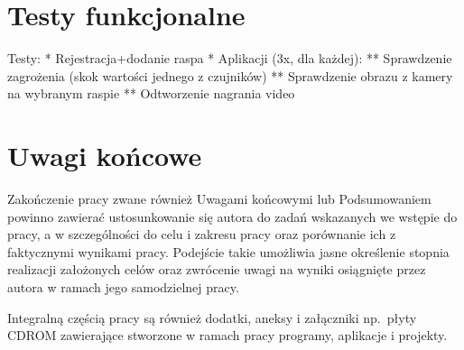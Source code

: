 \chapter{Testy funkcjonalne}

Testy:
 * Rejestracja+dodanie raspa
 * Aplikacji (3x, dla każdej):
 ** Sprawdzenie zagrożenia (skok wartości jednego z czujników)
 ** Sprawdzenie obrazu z kamery na wybranym raspie
 ** Odtworzenie nagrania video

\chapter{Uwagi końcowe}

Zakończenie pracy zwane również Uwagami końcowymi lub Podsumowaniem powinno zawierać ustosunkowanie
się autora do zadań wskazanych we wstępie do pracy, a w szczególności do celu i zakresu pracy oraz
porównanie ich z faktycznymi wynikami pracy. Podejście takie umożliwia jasne określenie stopnia
realizacji założonych celów oraz zwrócenie uwagi na wyniki osiągnięte przez autora w ramach jego
samodzielnej pracy.

Integralną częścią pracy są również dodatki, aneksy i załączniki np.~płyty CDROM
zawierające stworzone w ramach pracy programy, aplikacje i projekty.
